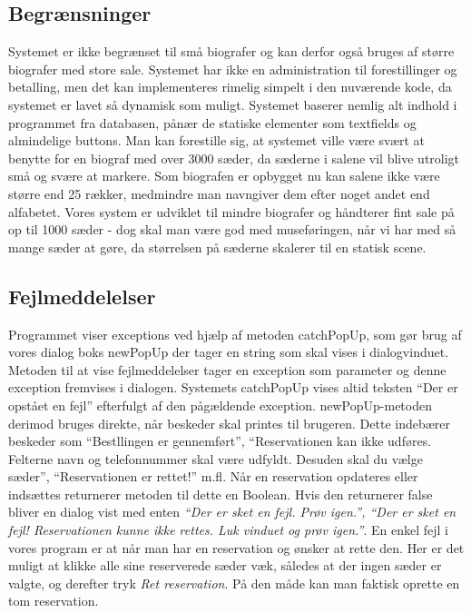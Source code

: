 \documentclass[final]{report}
\begin{document}
\subsection{Begrænsninger}
Systemet er ikke begrænset til små biografer og kan derfor også bruges af større biografer med store sale. Systemet har ikke en administration til forestillinger og betalling, men det kan implementeres rimelig simpelt i den nuværende kode, da systemet er lavet så dynamisk som muligt. Systemet baserer nemlig alt indhold i programmet fra databasen, pånær de statiske elementer som textfields og almindelige buttons. Man kan forestille sig, at systemet ville være svært at benytte for en biograf med over 3000 sæder, da sæderne i salene vil blive utroligt små og svære at markere. Som biografen er opbygget nu kan salene ikke være større end 25 rækker, medmindre man navngiver dem efter noget andet end alfabetet. Vores system er udviklet til mindre biografer og håndterer fint sale på op til 1000 sæder - dog skal man være god med museføringen, når vi har med så mange sæder at gøre, da størrelsen på sæderne skalerer til en statisk scene. 

\subsection{Fejlmeddelelser}
Programmet viser exceptions ved hjælp af metoden catchPopUp, som gør brug af vores dialog boks newPopUp der tager en string som skal vises i dialogvinduet. Metoden til at vise fejlmeddelelser tager en exception som parameter og denne exception fremvises i dialogen. Systemets catchPopUp vises altid teksten “Der er opstået en fejl” efterfulgt af den pågældende exception. newPopUp-metoden derimod bruges direkte, når beskeder skal printes til brugeren. Dette indebærer beskeder som “Bestllingen er gennemført”, “Reservationen kan ikke udføres. Felterne navn og telefonnummer skal være udfyldt. Desuden skal du vælge sæder”, “Reservationen er rettet!” m.fl. Når en reservation opdateres eller indsættes returnerer metoden til dette en Boolean. Hvis den returnerer false bliver en dialog vist med enten \emph{“Der er sket en fejl. Prøv igen.”, “Der er sket en fejl! Reservationen kunne ikke rettes. Luk vinduet og prøv igen.”}. En enkel fejl i vores program er at når man har en reservation og ønsker at rette den. Her er det muligt at klikke alle sine reserverede sæder væk, således at der ingen sæder er valgte, og derefter tryk \emph{Ret reservation}. På den måde kan man faktisk oprette en tom reservation. 
\end{document}
